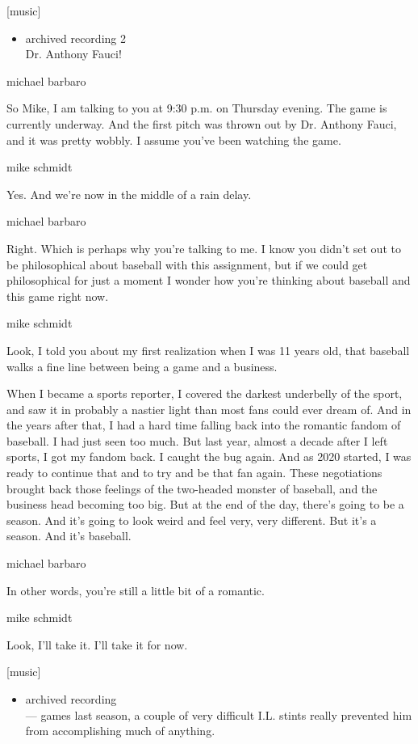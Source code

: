 {[}music{]}

\begin{itemize}
\tightlist
\item
  archived recording 2\\
  Dr. Anthony Fauci!
\end{itemize}

michael barbaro

So Mike, I am talking to you at 9:30 p.m. on Thursday evening. The game
is currently underway. And the first pitch was thrown out by Dr. Anthony
Fauci, and it was pretty wobbly. I assume you've been watching the game.

mike schmidt

Yes. And we're now in the middle of a rain delay.

michael barbaro

Right. Which is perhaps why you're talking to me. I know you didn't set
out to be philosophical about baseball with this assignment, but if we
could get philosophical for just a moment I wonder how you're thinking
about baseball and this game right now.

mike schmidt

Look, I told you about my first realization when I was 11 years old,
that baseball walks a fine line between being a game and a business.

When I became a sports reporter, I covered the darkest underbelly of the
sport, and saw it in probably a nastier light than most fans could ever
dream of. And in the years after that, I had a hard time falling back
into the romantic fandom of baseball. I had just seen too much. But last
year, almost a decade after I left sports, I got my fandom back. I
caught the bug again. And as 2020 started, I was ready to continue that
and to try and be that fan again. These negotiations brought back those
feelings of the two-headed monster of baseball, and the business head
becoming too big. But at the end of the day, there's going to be a
season. And it's going to look weird and feel very, very different. But
it's a season. And it's baseball.

michael barbaro

In other words, you're still a little bit of a romantic.

mike schmidt

Look, I'll take it. I'll take it for now.

{[}music{]}

\begin{itemize}
\tightlist
\item
  archived recording\\
  --- games last season, a couple of very difficult I.L. stints really
  prevented him from accomplishing much of anything.
\end{itemize}

